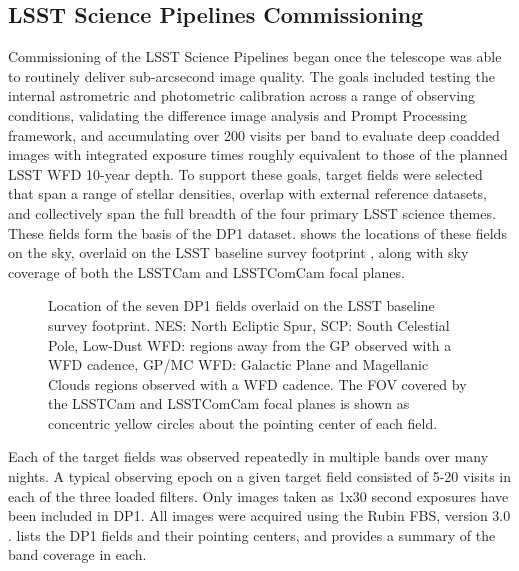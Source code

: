 \subsection{LSST Science Pipelines Commissioning
\label{ssec:pipelines_commissioning}}
Commissioning of the \gls{LSST Science Pipelines} \citep{PSTN-019} began once the telescope was able to routinely deliver sub-arcsecond image quality.
The goals included testing the internal astrometric and photometric calibration across a range of observing conditions, validating the difference image analysis and Prompt Processing \citep{dmtn-219} framework, and accumulating over 200 visits per band to evaluate deep coadded images with integrated exposure times roughly equivalent to those of the planned LSST \gls{WFD} 10-year depth.
To support these goals, \nfields target fields were selected that span a range of stellar densities, overlap with external reference datasets, and collectively span the full breadth of the four primary \gls{LSST} science themes.
These \nfields fields form the basis of the \gls{DP1} dataset.
 shows the locations of these \nfields fields on the sky, overlaid on the LSST baseline survey footprint \citep{PSTN-051, PSTN-052, PSTN-053, PSTN-055, PSTN-056}, along with sky coverage of both the LSSTCam and \gls{LSSTComCam} focal planes.
\begin{figure*}[bt!]
\centering
{}
\caption{Location of the seven DP1 fields overlaid on the \gls{LSST} baseline survey footprint. NES: North Ecliptic Spur, SCP: South Celestial Pole, Low-Dust WFD: regions away from the GP observed with a WFD cadence, GP/MC WFD: Galactic Plane and Magellanic Clouds regions observed with a WFD cadence. The \gls{FOV} covered by the \gls{LSSTCam} and \gls{LSSTComCam} focal planes is shown as concentric yellow circles about the pointing center of each field.}
\label{fig:dp1_fields_on_sky}
\end{figure*}
Each of the \nfields target fields was observed repeatedly in multiple bands over many nights.
A typical observing \gls{epoch} on a given target field consisted of 5-20 visits in each of the three loaded filters.
Only images taken as 1x30 second exposures have been included in \gls{DP1}.
All images were acquired using the Rubin \gls{FBS}, version 3.0 \citep{Naghib_2019, peter_yoachim_2024_13985198}.
 lists the \nfields \gls{DP1} fields and their pointing centers, and provides a summary of the band coverage in each.


